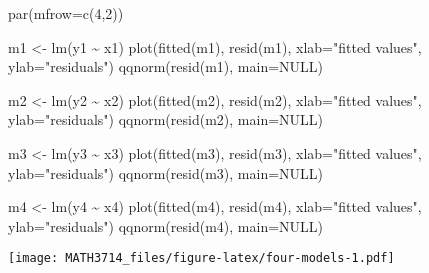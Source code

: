 \documentclass[
  a4paper,
]{article}
\newenvironment{Shaded}{\begin{snugshade}}{\end{snugshade}}
\newcommand{\AttributeTok}[1]{\textcolor[rgb]{0.77,0.63,0.00}{#1}}
\newcommand{\ConstantTok}[1]{\textcolor[rgb]{0.00,0.00,0.00}{#1}}
\newcommand{\DecValTok}[1]{\textcolor[rgb]{0.00,0.00,0.81}{#1}}
\newcommand{\FunctionTok}[1]{\textcolor[rgb]{0.00,0.00,0.00}{#1}}
\newcommand{\NormalTok}[1]{#1}
\newcommand{\OtherTok}[1]{\textcolor[rgb]{0.56,0.35,0.01}{#1}}
\newcommand{\SpecialCharTok}[1]{\textcolor[rgb]{0.00,0.00,0.00}{#1}}
\newcommand{\StringTok}[1]{\textcolor[rgb]{0.31,0.60,0.02}{#1}}
\theoremstyle{definition}
\theoremstyle{definition}
\theoremstyle{definition}
\theoremstyle{definition}
\theoremstyle{remark}
\begin{document}
\begin{Shaded}
\begin{Highlighting}[]
    \FunctionTok{par}\NormalTok{(}\AttributeTok{mfrow=}\FunctionTok{c}\NormalTok{(}\DecValTok{4}\NormalTok{,}\DecValTok{2}\NormalTok{))}

\NormalTok{    m1 }\OtherTok{\textless{}{-}} \FunctionTok{lm}\NormalTok{(y1 }\SpecialCharTok{\textasciitilde{}}\NormalTok{ x1)}
    \FunctionTok{plot}\NormalTok{(}\FunctionTok{fitted}\NormalTok{(m1), }\FunctionTok{resid}\NormalTok{(m1), }\AttributeTok{xlab=}\StringTok{"fitted values"}\NormalTok{, }\AttributeTok{ylab=}\StringTok{"residuals"}\NormalTok{)}
    \FunctionTok{qqnorm}\NormalTok{(}\FunctionTok{resid}\NormalTok{(m1), }\AttributeTok{main=}\ConstantTok{NULL}\NormalTok{)}

\NormalTok{    m2 }\OtherTok{\textless{}{-}} \FunctionTok{lm}\NormalTok{(y2 }\SpecialCharTok{\textasciitilde{}}\NormalTok{ x2)}
    \FunctionTok{plot}\NormalTok{(}\FunctionTok{fitted}\NormalTok{(m2), }\FunctionTok{resid}\NormalTok{(m2), }\AttributeTok{xlab=}\StringTok{"fitted values"}\NormalTok{, }\AttributeTok{ylab=}\StringTok{"residuals"}\NormalTok{)}
    \FunctionTok{qqnorm}\NormalTok{(}\FunctionTok{resid}\NormalTok{(m2), }\AttributeTok{main=}\ConstantTok{NULL}\NormalTok{)}

\NormalTok{    m3 }\OtherTok{\textless{}{-}} \FunctionTok{lm}\NormalTok{(y3 }\SpecialCharTok{\textasciitilde{}}\NormalTok{ x3)}
    \FunctionTok{plot}\NormalTok{(}\FunctionTok{fitted}\NormalTok{(m3), }\FunctionTok{resid}\NormalTok{(m3), }\AttributeTok{xlab=}\StringTok{"fitted values"}\NormalTok{, }\AttributeTok{ylab=}\StringTok{"residuals"}\NormalTok{)}
    \FunctionTok{qqnorm}\NormalTok{(}\FunctionTok{resid}\NormalTok{(m3), }\AttributeTok{main=}\ConstantTok{NULL}\NormalTok{)}

\NormalTok{    m4 }\OtherTok{\textless{}{-}} \FunctionTok{lm}\NormalTok{(y4 }\SpecialCharTok{\textasciitilde{}}\NormalTok{ x4)}
    \FunctionTok{plot}\NormalTok{(}\FunctionTok{fitted}\NormalTok{(m4), }\FunctionTok{resid}\NormalTok{(m4), }\AttributeTok{xlab=}\StringTok{"fitted values"}\NormalTok{, }\AttributeTok{ylab=}\StringTok{"residuals"}\NormalTok{)}
    \FunctionTok{qqnorm}\NormalTok{(}\FunctionTok{resid}\NormalTok{(m4), }\AttributeTok{main=}\ConstantTok{NULL}\NormalTok{)}
\end{Highlighting}
\end{Shaded}

\texttt{[image: MATH3714\_files/figure-latex/four-models-1.pdf]}
\end{document}
